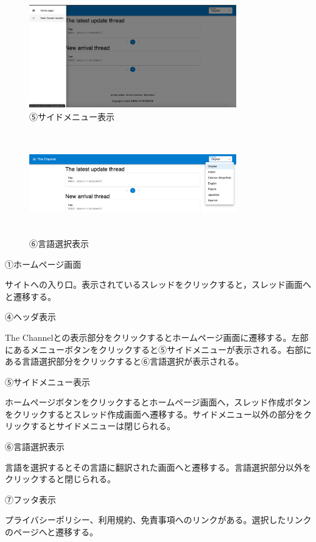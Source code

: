 \documentclass[b5paper,12pt]{jsreport}
\begin{document}
\begin{figure}[htbp]
	\centering
	\includegraphics[width=90mm,height=45mm]{img/side_menu.png}

	\caption*{⑤サイドメニュー表示}
\end{figure}

\begin{figure}[htbp]
	\centering
	\includegraphics[width=90mm,height=45mm]{./img/select_language.png}

	\caption*{⑥言語選択表示}
\end{figure}

①ホームページ画面

サイトへの入り口。表示されているスレッドをクリックすると，スレッド画面へと遷移する。

④ヘッダ表示

The Channelとの表示部分をクリックするとホームページ画面に遷移する。左部にあるメニューボタンをクリックすると⑤サイドメニューが表示される。右部にある言語選択部分をクリックすると⑥言語選択が表示される。

⑤サイドメニュー表示

ホームページボタンをクリックするとホームページ画面へ，スレッド作成ボタンをクリックするとスレッド作成画面へ遷移する。サイドメニュー以外の部分をクリックするとサイドメニューは閉じられる。

⑥言語選択表示

言語を選択するとその言語に翻訳された画面へと遷移する。言語選択部分以外をクリックすると閉じられる。

⑦フッタ表示

プライバシーポリシー、利用規約、免責事項へのリンクがある。選択したリンクのページへと遷移する。
\end{document}
